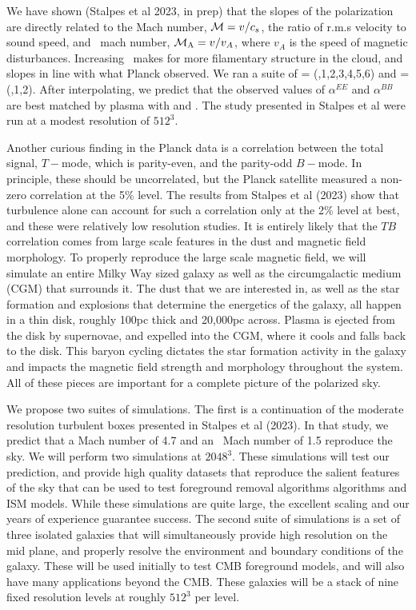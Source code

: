 We have shown (Stalpes et al 2023, in prep) that the slopes of the polarization
are directly related to the Mach number, $\mathcal{M}=v/c_s$, the ratio of
r.m.s velocity to sound speed, and \alf\ mach number, $\mathcal{M_{\rm{A}}}=v/v_A$, where
$v_A$ is the speed of magnetic disturbances.  Increasing \mach\ makes for more
filamentary structure in the cloud, and slopes in line with what Planck
observed.  We ran a suite of \mach = (\half,1,2,3,4,5,6) and \alfmach=(\half,1,2).  After
interpolating, we predict that the observed values of $\alpha^{EE}$ and
$\alpha^{BB}$ are best matched by plasma with  and . The
study presented in Stalpes et al were run at a modest resolution of $512^3$.  

Another curious finding in the Planck data is a correlation between the total
signal, $T-$mode, which is parity-even, and the parity-odd $B-$mode.  In principle, these should be
uncorrelated, but the Planck satellite measured a non-zero correlation at the
5\% level.  The results from Stalpes et al (2023) show that turbulence alone can
account for such a correlation only at the 2\% level at best, and these were
relatively low resolution studies.  It is entirely likely that the $TB$
correlation comes from large scale features in the dust and magnetic field
morphology.  To properly reproduce the large scale magnetic field, we will
simulate an entire Milky Way sized galaxy as well as the circumgalactic medium
(CGM) that surrounds it. The dust that we are interested in, as well as the star
formation and explosions that determine the energetics of the galaxy, all happen
in a thin disk, roughly 100pc thick and 20,000pc across.  Plasma is ejected from
the disk by supernovae, and expelled into the CGM, where it cools and falls back
to the disk.  This baryon cycling dictates the star formation activity in the
galaxy and impacts the magnetic field strength and morphology throughout the
system.  All of these pieces are important for a complete picture of the
polarized sky.

We propose two suites of simulations.  The first is a continuation of the
moderate resolution turbulent boxes presented in Stalpes et al (2023).  In that
study, we predict that a Mach number of 4.7 and an \alf\ Mach number of 1.5
reproduce the sky.  We will perform two simulations at $2048^3$.  These
simulations will test our prediction, and provide high quality datasets that
reproduce the salient features of the sky that can be used to test foreground
removal algorithms algorithms and ISM models.  While these simulations are quite
large, the excellent scaling and our years of experience guarantee success.
The second suite of simulations
is a set of three isolated galaxies that will simultaneously provide high
resolution on the mid plane, and properly resolve the environment and boundary
conditions of the galaxy.  These will be used initially to test CMB foreground
models, and will also have many applications beyond the CMB.  These galaxies
will be a stack of nine fixed resolution levels at roughly $512^3$ per level.
